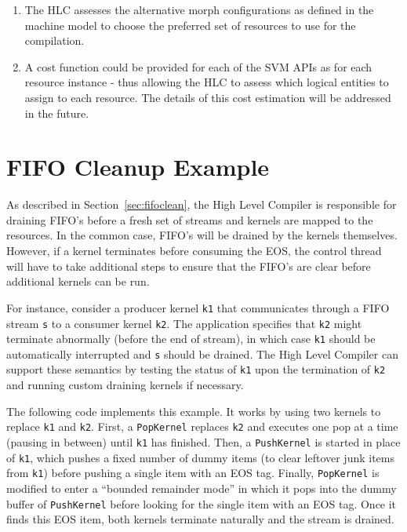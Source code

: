 \begin{enumerate}
\item The HLC assesses the alternative morph configurations as defined
in the machine model to choose the preferred set of resources to use
for the compilation.

\item A cost function could be provided for each of the SVM APIs as
for each resource instance - thus allowing the HLC to assess which
logical entities to assign to each resource.  The details of this cost
estimation will be addressed in the future.

\end{enumerate}

\appendix

\clearpage
\section{FIFO Cleanup Example}  %
\label{sec:fifocleanexample}
As described in Section~\ref{sec:fifoclean}, the High Level Compiler
is responsible for draining FIFO's before a fresh set of streams and
kernels are mapped to the resources.  In the common case, FIFO's will
be drained by the kernels themselves.  However, if a kernel terminates
before consuming the EOS, the control thread will have to take
additional steps to ensure that the FIFO's are clear before additional
kernels can be run.

For instance, consider a producer kernel {\tt k1} that communicates
through a FIFO stream {\tt s} to a consumer kernel {\tt k2}.  The
application specifies that {\tt k2} might terminate abnormally (before
the end of stream), in which case {\tt k1} should be automatically
interrupted and {\tt s} should be drained.  The High Level Compiler
can support these semantics by testing the status of {\tt k1} upon the
termination of {\tt k2} and running custom draining kernels if
necessary.  

The following code implements this example.  It works by using two
kernels to replace {\tt k1} and {\tt k2}.  First, a {\tt PopKernel}
replaces {\tt k2} and executes one pop at a time (pausing in between)
until {\tt k1} has finished.  Then, a {\tt PushKernel} is started in
place of {\tt k1}, which pushes a fixed number of dummy items (to
clear leftover junk items from {\tt k1}) before pushing a single item
with an EOS tag.  Finally, {\tt PopKernel} is modified to enter a
``bounded remainder mode'' in which it pops into the dummy buffer of
{\tt PushKernel} before looking for the single item with an EOS tag.
Once it finds this EOS item, both kernels terminate naturally and the
stream is drained.

